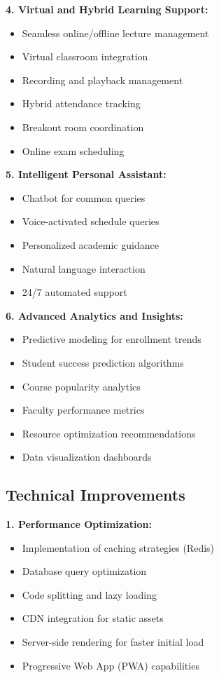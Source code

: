 \textbf{4. Virtual and Hybrid Learning Support:}
\begin{itemize}
    \item Seamless online/offline lecture management
    \item Virtual classroom integration
    \item Recording and playback management
    \item Hybrid attendance tracking
    \item Breakout room coordination
    \item Online exam scheduling
\end{itemize}

\textbf{5. Intelligent Personal Assistant:}
\begin{itemize}
    \item Chatbot for common queries
    \item Voice-activated schedule queries
    \item Personalized academic guidance
    \item Natural language interaction
    \item 24/7 automated support
\end{itemize}

\textbf{6. Advanced Analytics and Insights:}
\begin{itemize}
    \item Predictive modeling for enrollment trends
    \item Student success prediction algorithms
    \item Course popularity analytics
    \item Faculty performance metrics
    \item Resource optimization recommendations
    \item Data visualization dashboards
\end{itemize}

\subsection{Technical Improvements}

\textbf{1. Performance Optimization:}
\begin{itemize}
    \item Implementation of caching strategies (Redis)
    \item Database query optimization
    \item Code splitting and lazy loading
    \item CDN integration for static assets
    \item Server-side rendering for faster initial load
    \item Progressive Web App (PWA) capabilities
\end{itemize}

